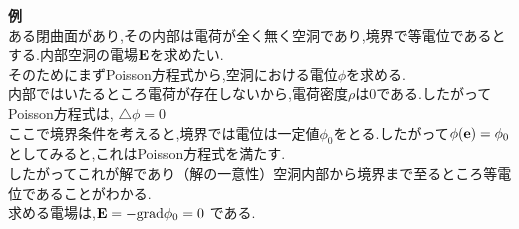 \documentclass{jsarticle}
\begin{document}
{\bf 例} \\
ある閉曲面があり,その内部は電荷が全く無く空洞であり,境界で等電位であるとする.内部空洞の電場${\bf E}$を求めたい. \\
そのためにまずPoisson方程式から,空洞における電位$\phi$を求める. \\
内部ではいたるところ電荷が存在しないから,電荷密度$\rho$は0である.したがってPoisson方程式は, $\bigtriangleup \phi = 0$ \\
ここで境界条件を考えると,境界では電位は一定値$\phi_0$をとる.したがって$\phi({\bf e}) = \phi_0$としてみると,これはPoisson方程式を満たす. \\
したがってこれが解であり（解の一意性）空洞内部から境界まで至るところ等電位であることがわかる. \\
求める電場は,${\bf E} = - {\rm grad} \phi_0 = 0$ である.
\end{document}
